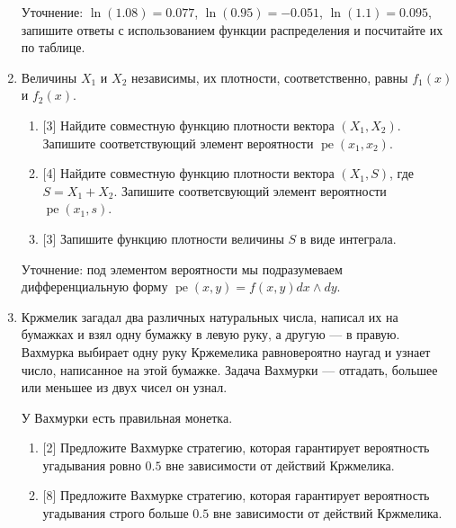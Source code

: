 \documentclass[12pt]{article}
\DeclareMathOperator{\pe}{pe}
\begin{document}
\begin{enumerate}
Уточнение: $\ln(1.08) = 0.077$, $\ln(0.95) = -0.051$, $\ln(1.1) = 0.095$, запишите ответы с использованием функции распределения и посчитайте их по таблице.

\item Величины $X_1$ и $X_2$ независимы, их плотности, соответственно, равны $f_1(x)$ и $f_2(x)$.
\begin{enumerate}
    \item {[3]} Найдите совместную функцию плотности вектора $(X_1, X_2)$.
    Запишите соответствующий элемент вероятности $\pe(x_1, x_2)$. 
    \item {[4]} Найдите совместную функцию плотности вектора $(X_1, S)$, где $S = X_1 + X_2$.
    Запишите соответсвующий элемент вероятности $\pe(x_1, s)$.
    \item {[3]} Запишите функцию плотности величины $S$ в виде интеграла. 
\end{enumerate}

Уточнение: под элементом вероятности мы подразумеваем дифференциальную форму $\pe(x, y) = f(x, y) dx \wedge dy$.

\item Кржмелик загадал два различных натуральных числа, написал их на бумажках и взял одну бумажку в левую руку, а другую — в правую.
Вахмурка выбирает одну руку Кржемелика равновероятно наугад и узнает число, написанное на этой бумажке.
Задача Вахмурки — отгадать, большее или меньшее из двух чисел он узнал.

У Вахмурки есть правильная монетка. 
\begin{enumerate}
    \item {[2]} Предложите Вахмурке стратегию, которая гарантирует вероятность угадывания ровно $0.5$ вне зависимости от действий Кржмелика.
    \item {[8]} Предложите Вахмурке стратегию, которая гарантирует вероятность угадывания строго больше $0.5$ вне зависимости от действий Кржмелика.
\end{enumerate}
\end{enumerate}
\end{document}
